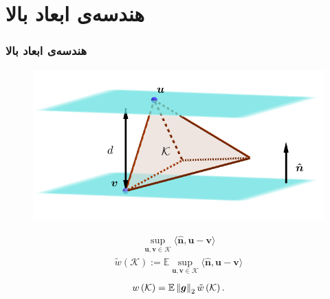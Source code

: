 \section{هندسه‌ی ابعاد بالا\hfill}
\begin{frame}
\frametitle{هندسه‌ی ابعاد بالا}
\begin{figure}
\centering
\includegraphics[scale=0.2]{Images/width.png}
\end{figure}
\begin{align*}
	\sup_{\bm{u},\bm{v}\in \mathcal{K}} \langle \hat{\bm{n}}, \bm{u}-\bm{v}  \rangle
\end{align*}
\begin{align} 
\tilde{w}\left(\mathcal{K}\right) := \mathbb{E} \sup_{\bm{u},\bm{v}\in \mathcal{K}} \langle \hat{\bm{n}}, \bm{u}-\bm{v}  \rangle
\end{align} 
\begin{align*}
w\left(\mathcal{K}\right) =  \mathbb{E} \left\lVert\bm{g}\right\rVert_{2} \tilde{w}\left(\mathcal{K}\right).
\end{align*} 
\end{frame}
